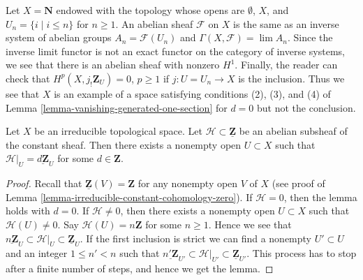 \begin{example}
\label{example-datta}
Let $X = \mathbf{N}$ endowed with the topology whose opens are
$\emptyset$, $X$, and $U_n = \{i \mid i \leq n\}$ for $n \geq 1$.
An abelian sheaf $\mathcal{F}$ on $X$ is the same as an inverse
system of abelian groups $A_n = \mathcal{F}(U_n)$ and
$\Gamma(X, \mathcal{F}) = \lim A_n$. Since the inverse limit
functor is not an exact functor on the category of inverse systems,
we see that there is an abelian sheaf with nonzero $H^1$.
Finally, the reader can check that $H^p(X, j_!\mathbf{Z}_U) = 0$,
$p \geq 1$ if $j : U = U_n \to X$ is the inclusion. Thus we see
that $X$ is an example of a space satisfying conditions (2), (3), and (4) of
Lemma \ref{lemma-vanishing-generated-one-section} for $d = 0$
but not the conclusion.
\end{example}

\begin{lemma}
\label{lemma-subsheaf-irreducible}
Let $X$ be an irreducible topological space.
Let $\mathcal{H} \subset \underline{\mathbf{Z}}$ be
an abelian subsheaf of the constant sheaf.
Then there exists a nonempty open $U \subset X$ such
that $\mathcal{H}|_U = \underline{d\mathbf{Z}}_U$
for some $d \in \mathbf{Z}$.
\end{lemma}

\begin{proof}
Recall that $\underline{\mathbf{Z}}(V) = \mathbf{Z}$
for any nonempty open $V$ of $X$ (see proof of
Lemma \ref{lemma-irreducible-constant-cohomology-zero}).
If $\mathcal{H} = 0$, then the lemma holds with $d = 0$.
If $\mathcal{H} \not = 0$, then there exists a nonempty open
$U \subset X$ such that $\mathcal{H}(U) \not = 0$.
Say $\mathcal{H}(U) = n\mathbf{Z}$ for some $n \geq 1$.
Hence we see that
$\underline{n\mathbf{Z}}_U
\subset \mathcal{H}|_U \subset
\underline{\mathbf{Z}}_U$. If the first inclusion is strict we
can find a nonempty $U' \subset U$ and an integer $1 \leq n' < n$
such that
$\underline{n'\mathbf{Z}}_{U'}
\subset \mathcal{H}|_{U'} \subset
\underline{\mathbf{Z}}_{U'}$.
This process has to stop after a finite number of steps, and
hence we get the lemma.
\end{proof}

